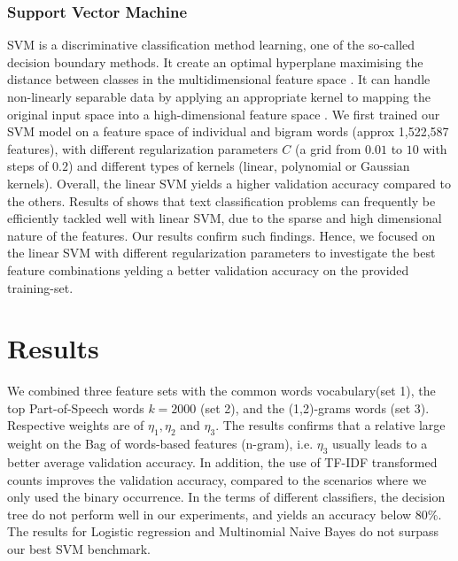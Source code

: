 \documentclass[twoside,twocolumn]{article}
\begin{document}
\subsubsection{Support Vector Machine}
SVM is a discriminative classification method learning, one of the so-called decision boundary methods. It create an optimal hyperplane maximising the distance between classes in the multidimensional feature space \citep{vapnik2013nature}. It can handle non-linearly separable data by applying an appropriate kernel to mapping the original input space into a high-dimensional feature space \citep{smola2004tutorial}. 
We first trained our SVM model on a feature space of individual and bigram words (approx 1,522,587 features), with different regularization parameters $C$ (a grid from $0.01$ to $10$ with steps of $0.2$) and different types of kernels (linear, polynomial or Gaussian kernels). Overall, the linear SVM yields a higher validation accuracy compared to the others. 
Results of \cite{joachims1998text} shows that text classification problems can frequently be efficiently tackled well with linear SVM, due to the sparse and high dimensional nature of the features. Our results confirm such findings.
Hence, we focused on the linear SVM with different regularization parameters to investigate the best feature combinations yelding a better validation accuracy on the provided training-set.




\section{Results}
We combined  three feature sets with the common words vocabulary(set 1), the top Part-of-Speech words $k=2000$ (set 2), and the (1,2)-grams words (set 3). Respective weights are of $\eta_1, \eta_2$ and $\eta_3$. The results confirms that a relative large weight on the Bag of words-based features (n-gram), i.e. $\eta_3$ usually leads to a better average validation accuracy. 
In addition, the use of TF-IDF transformed counts improves the validation accuracy, compared to the scenarios where we only used the binary occurrence.
In the terms of different classifiers, the decision tree do not perform well in our experiments, and yields an accuracy below 80\%. The results for Logistic regression and Multinomial Naive Bayes do not surpass our best SVM benchmark.
\end{document}

